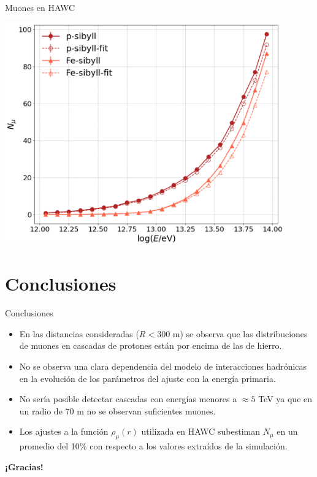 \documentclass[10pt,xcolor=table]{beamer}
\begin{document}
\begin{frame}{Muones en HAWC}
	\begin{center}
	\includegraphics[width=0.9\textwidth]{Figuras/p-munumbers.png}
	\end{center}
\end{frame}


\section{Conclusiones}
\begin{frame}{Conclusiones}
	\begin{itemize}
	\item <+-> En las distancias consideradas ($R<300$ m) se observa que las distribuciones de muones en cascadas de protones est\'an por encima de las de hierro.
	\vspace{0.2cm}
	\item <+-> No se observa una clara dependencia del modelo de interacciones hadr\'onicas en la evoluci\'on de los par\'ametros del ajuste con la energ\'ia primaria.
	\vspace{0.2cm}
	\item <+-> No ser\'ia posible detectar cascadas con energ\'ias menores a $\approx 5$ TeV ya que en un radio de 70 m no se observan suficientes muones.
	\vspace{0.2cm}
	\item <+-> Los ajustes a la funci\'on $\rho_{\mu}(r)$ utilizada en HAWC subestiman $N_{\mu}$ en un promedio del 10\% con respecto a los valores extra\'idos de la simulaci\'on.
	\end{itemize}
	
	\begin{huge}
	\vfill
	\hfill  {}\textbf{¡Gracias!}
	\end{huge}
\end{frame}
\end{document}
